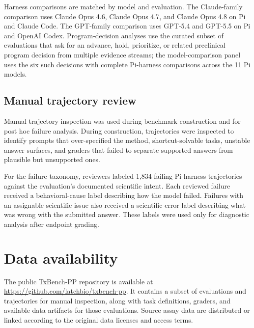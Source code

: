 \documentclass[10pt,letterpaper]{article}
\begin{document}
Harness comparisons are matched by model and evaluation. The Claude-family
comparison uses Claude Opus 4.6, Claude Opus 4.7, and Claude Opus 4.8 on Pi
and Claude Code. The GPT-family comparison uses GPT-5.4 and GPT-5.5 on Pi and
OpenAI Codex. Program-decision analyses use the curated subset of evaluations
that ask for an advance, hold, prioritize, or related preclinical program
decision from multiple evidence streams; the model-comparison panel uses the
six such decisions with complete Pi-harness comparisons across the 11 Pi
models.

\subsection{Manual trajectory review}

Manual trajectory inspection was used during benchmark construction and for
post hoc failure analysis. During construction, trajectories were inspected to
identify prompts that over-specified the method, shortcut-solvable tasks,
unstable answer surfaces, and graders that failed to separate supported
answers from plausible but unsupported ones.

For the failure taxonomy, reviewers labeled 1{,}834 failing Pi-harness
trajectories against the evaluation's documented scientific intent. Each
reviewed failure received a behavioral-cause label describing how the model
failed. Failures with an assignable scientific issue also received a
scientific-error label describing what was wrong with the submitted answer.
These labels were used only for diagnostic analysis after endpoint grading.

\section*{Data availability}

The public TxBench-PP repository is available at
\url{https://github.com/latchbio/txbench-pp}. It contains a subset of
evaluations and trajectories for manual inspection, along with task definitions,
graders, and available data artifacts for those evaluations. Source assay data
are distributed or linked according to the original data licenses and access
terms.



\EndBody
\end{document}
